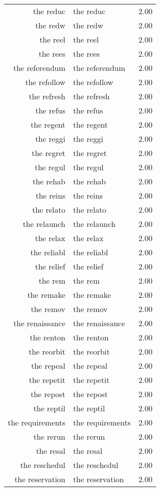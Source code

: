 \begin{table}[ht]
\begin{tabular}{rlr}
  the reduc & the reduc & 2.00 \\ 
  the redw & the redw & 2.00 \\ 
  the reel & the reel & 2.00 \\ 
  the rees & the rees & 2.00 \\ 
  the referendum & the referendum & 2.00 \\ 
  the refollow & the refollow & 2.00 \\ 
  the refresh & the refresh & 2.00 \\ 
  the refus & the refus & 2.00 \\ 
  the regent & the regent & 2.00 \\ 
  the reggi & the reggi & 2.00 \\ 
  the regret & the regret & 2.00 \\ 
  the regul & the regul & 2.00 \\ 
  the rehab & the rehab & 2.00 \\ 
  the reins & the reins & 2.00 \\ 
  the relato & the relato & 2.00 \\ 
  the relaunch & the relaunch & 2.00 \\ 
  the relax & the relax & 2.00 \\ 
  the reliabl & the reliabl & 2.00 \\ 
  the relief & the relief & 2.00 \\ 
  the rem & the rem & 2.00 \\ 
  the remake & the remake & 2.00 \\ 
  the remov & the remov & 2.00 \\ 
  the renaissance & the renaissance & 2.00 \\ 
  the renton & the renton & 2.00 \\ 
  the reorbit & the reorbit & 2.00 \\ 
  the repeal & the repeal & 2.00 \\ 
  the repetit & the repetit & 2.00 \\ 
  the repost & the repost & 2.00 \\ 
  the reptil & the reptil & 2.00 \\ 
  the requirements & the requirements & 2.00 \\ 
  the rerun & the rerun & 2.00 \\ 
  the resal & the resal & 2.00 \\ 
  the reschedul & the reschedul & 2.00 \\ 
  the reservation & the reservation & 2.00 \\ 

\end{tabular}
\end{table}
